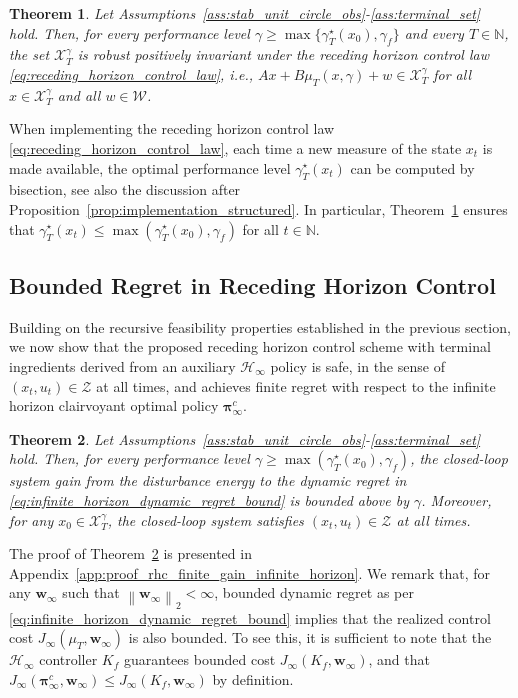 \documentclass[conference]{IEEEtran}
\newtheorem{theorem}{Theorem}
\newcommand{\normtwo}[1]{\left\lVert#1\right\rVert_{2}}
\begin{document}
\begin{theorem}
    \label{th:recursive_feasibility_terminal_rpi}
    Let Assumptions~\ref{ass:stab_unit_circle_obs}-\ref{ass:terminal_set} hold. Then, for every performance level $\gamma \geq \operatorname{max}\{\gamma_T^\star(x_0), \gamma_f\}$ and every $T \in \mathbb{N}$, the set $\mathcal{X}_T^\gamma$ is robust positively invariant under the receding horizon control law \eqref{eq:receding_horizon_control_law}, i.e., $A x + B\mu_T(x, \gamma) + w \in \mathcal{X}_T^\gamma$ for all $x \in \mathcal{X}_T^\gamma$ and all $w \in \mathcal{W}$.
\end{theorem}
When implementing the receding horizon control law \eqref{eq:receding_horizon_control_law}, each time a new measure of the state $x_t$ is made available, the optimal performance level $\gamma_T^\star(x_t)$ can be computed by bisection, see also the discussion after Proposition~\ref{prop:implementation_structured}. In particular, Theorem~\ref{th:recursive_feasibility_terminal_rpi} ensures that $\gamma_T^\star(x_t) \leq \operatorname{max}(\gamma_T^\star(x_0), \gamma_f)$ for all $t \in \mathbb{N}$.

\subsection{Bounded Regret in Receding Horizon Control}
Building on the recursive feasibility properties established in the previous section, we now show that the proposed receding horizon control scheme with terminal ingredients derived from an auxiliary $\mathcal{H}_\infty$ policy is safe, in the sense of $(x_t, u_t) \in \mathcal{Z}$ at all times, and achieves finite regret with respect to the infinite horizon clairvoyant optimal policy $\bm{\pi}_\infty^c$.
\begin{theorem}
    \label{th:rhc_finite_gain_infinite_horizon}
    Let Assumptions~\ref{ass:stab_unit_circle_obs}-\ref{ass:terminal_set} hold.
    Then, for every performance level $\gamma \geq \operatorname{max}(\gamma_T^\star(x_0), \gamma_f)$, the closed-loop system gain from the disturbance energy to the dynamic regret in \eqref{eq:infinite_horizon_dynamic_regret_bound} is bounded above by $\gamma$. Moreover, for any $x_0 \in \mathcal{X}^\gamma_T$, the closed-loop system satisfies $(x_t, u_t) \in \mathcal{Z}$ at all times.
\end{theorem}

The proof of Theorem~\ref{th:rhc_finite_gain_infinite_horizon} is presented in Appendix~\ref{app:proof_rhc_finite_gain_infinite_horizon}. We remark that, for any $\mathbf{w}_\infty$ such that $\normtwo{\mathbf{w}_\infty}<\infty$, bounded dynamic regret as per \eqref{eq:infinite_horizon_dynamic_regret_bound} implies that the realized control cost $J_\infty(\mu_T, \mathbf{w}_\infty)$ is also bounded. To see this, it is sufficient to note that the $\mathcal{H}_\infty$ controller $K_f$ guarantees bounded cost $J_\infty(K_f, \mathbf{w}_{\infty})$, and that $J_\infty(\bm{\pi}_\infty^c, \mathbf{w}_{\infty}) \leq J_\infty(K_f, \mathbf{w}_{\infty})$ by definition.
\end{document}
